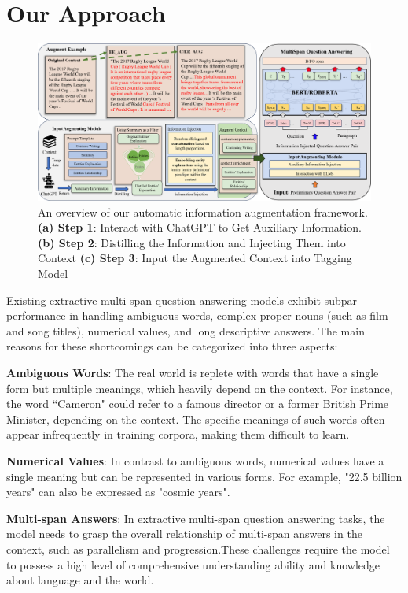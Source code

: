 \section{Our Approach}

\begin{figure}[h]
	\centering
	\includegraphics[width=18cm]{overview.png}
	\caption{An overview of our automatic information augmentation framework. \textbf{(a) Step 1}: Interact with ChatGPT to Get Auxiliary Information. \textbf{(b) Step 2}: Distilling the Information and Injecting Them into Context \textbf{(c) Step 3}: Input the Augmented Context into Tagging Model}
	\label{fig:overview}
\end{figure}   


Existing extractive multi-span question answering models exhibit subpar performance in handling ambiguous words, complex proper nouns (such as film and song titles), numerical values, and long descriptive answers. The main reasons for these shortcomings can be categorized into three aspects:

\textbf{Ambiguous Words}: The real world is replete with words that have a single form but multiple meanings, which heavily depend on the context. For instance, the word ``Cameron" could refer to a famous director or a former British Prime Minister, depending on the context. The specific meanings of such words often appear infrequently in training corpora, making them difficult to learn.

\textbf{Numerical Values}: In contrast to ambiguous words, numerical values have a single meaning but can be represented in various forms. For example, "22.5 billion years" can also be expressed as "cosmic years".

\textbf{Multi-span Answers}: In extractive multi-span question answering tasks, the model needs to grasp the overall relationship of multi-span answers in the context, such as parallelism and progression.These challenges require the model to possess a high level of comprehensive understanding ability and knowledge about language and the world. 

